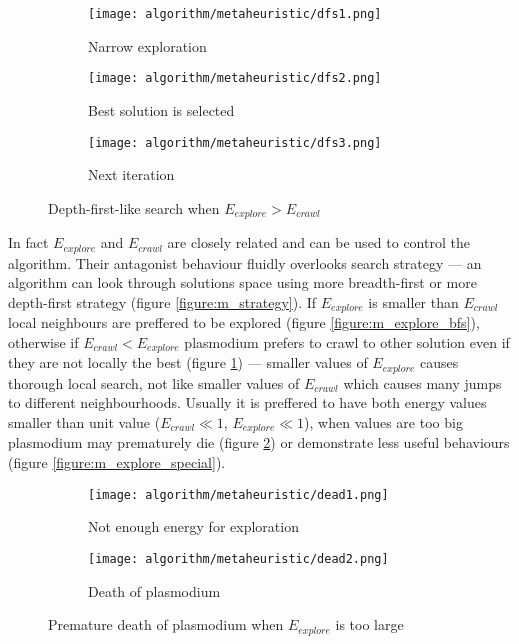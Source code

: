 \begin{figure}
  \centering

  \begin{subfigure}{0.3\textwidth}
    \centering
    \texttt{[image: algorithm/metaheuristic/dfs1.png]}
    \caption{Narrow exploration}
  \end{subfigure}
  \begin{subfigure}{0.3\textwidth}
    \centering
    \texttt{[image: algorithm/metaheuristic/dfs2.png]}
    \caption{Best solution is selected}
  \end{subfigure}
  \begin{subfigure}{0.3\textwidth}
    \centering
    \texttt{[image: algorithm/metaheuristic/dfs3.png]}
    \caption{Next iteration}
  \end{subfigure}

  \caption{Depth-first-like search when $E_{explore} > E_{crawl}$}
  \label{figure:m_explore_dfs}
\end{figure}

In fact $E_{explore}$ and $E_{crawl}$ are closely related and can be used to control the algorithm. Their antagonist behaviour fluidly overlooks search strategy --- an algorithm can look through solutions space using more breadth-first or more depth-first strategy (figure \ref{figure:m_strategy}). If $E_{explore}$ is smaller than $E_{crawl}$ local neighbours are preffered to be explored (figure \ref{figure:m_explore_bfs}), otherwise if $E_{crawl} < E_{explore}$ plasmodium prefers to crawl to other solution even if they are not locally the best (figure \ref{figure:m_explore_dfs}) --- smaller values of $E_{explore}$ causes thorough local search, not like smaller values of $E_{crawl}$ which causes many jumps to different neighbourhoods. Usually it is preffered to have both energy values smaller than unit value ($E_{crawl} \ll 1$, $E_{explore} \ll 1$), when values are too big plasmodium may prematurely die (figure \ref{figure:m_explore_dead}) or demonstrate less useful behaviours (figure \ref{figure:m_explore_special}).

\begin{figure}
  \centering

  \begin{subfigure}{0.3\textwidth}
    \centering
    \texttt{[image: algorithm/metaheuristic/dead1.png]}
    \caption{Not enough energy for exploration}
  \end{subfigure}
  \begin{subfigure}{0.3\textwidth}
    \centering
    \texttt{[image: algorithm/metaheuristic/dead2.png]}
    \caption{Death of plasmodium}
  \end{subfigure}

  \caption{Premature death of plasmodium when $E_{explore}$ is too large}
  \label{figure:m_explore_dead}
\end{figure}

